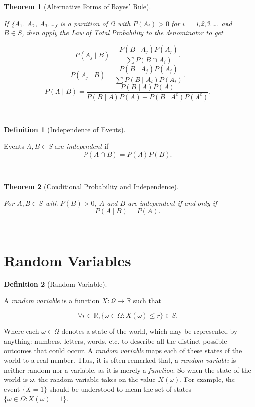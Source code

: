 \documentclass[
]{article}
\newtheorem{theorem}{Theorem}[section]
\theoremstyle{definition}
\newtheorem{definition}{Definition}[section]
\theoremstyle{definition}
\theoremstyle{definition}
\theoremstyle{remark}
\begin{document}
\begin{theorem}[Alternative Forms of Bayes' Rule]
\protect\hypertarget{thm:unlabeled-div-13}{}\label{thm:unlabeled-div-13}

If \{\(A_1\), \(A_2\), \(A_3\),\ldots\} is a \emph{partition} of \(\Omega\) with \(P(A_i) > 0\) for \(i\) = 1,2,3,\ldots, and \(B \in S\), then apply the Law of Total Probability to the denominator to get

\[P(A_j \mid B) = \frac {P(B \mid A_j)P(A_j)}{\sum P(B \cap A_i)}.\]
\[P(A_j \mid B) = \frac {P(B \mid A_j)P(A_j)}{\sum P(B \mid A_i)P(A_i)}.\]
\[P(A \mid B) = \frac {P(B \mid A)P(A)}{P(B \mid A)P(A) + P(B \mid A^c)P(A^c)}.\]

~

\end{theorem}

\begin{definition}[Independence of Events]
\protect\hypertarget{def:unlabeled-div-14}{}\label{def:unlabeled-div-14}

Events \(A,B \in S\) are \emph{independent} if
\[P(A \cap B) = P(A)P(B).\]

~

\end{definition}

\begin{theorem}[Conditional Probability and Independence]
\protect\hypertarget{thm:unlabeled-div-15}{}\label{thm:unlabeled-div-15}

For \(A,B \in S\) with \(P(B) > 0\), \(A\) and \(B\) are independent if and only if
\[P(A \mid B) = P(A).\]

~

\end{theorem}

\hypertarget{random-variables}{%
\section{Random Variables}\label{random-variables}}

\begin{definition}[Random Variable]
\protect\hypertarget{def:unlabeled-div-16}{}\label{def:unlabeled-div-16}

A \emph{random variable} is a function \(X: \Omega \to \mathbb{R}\) such that

\[\forall r \in \mathbb{R}, \{\omega \in \Omega: X(\omega) \leq r \} \in S.\]

Where each \(\omega \in \Omega\) denotes a state of the world, which may be represented by anything: numbers, letters, words, etc. to describe all the distinct possible outcomes that could occur. A \emph{random variable} maps each of these states of the world to a real number. Thus, it is often remarked that, a \emph{random variable} is neither random nor a variable, as it is merely a \emph{function}. So when the state of the world is \(\omega\), the random variable takes on the value \(X(\omega)\). For example, the event \(\{X = 1\}\) should be understood to mean the set of states \(\{\omega \in \Omega: X(\omega) = 1\}\).

\end{definition}
\end{document}
